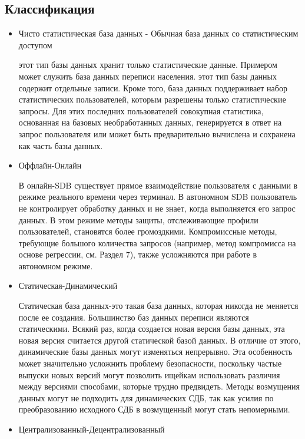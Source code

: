 \subsection{Классификация}
\begin{itemize}
Классифицирует по следующим признакам:
    \item Чисто статистическая база данных - Обычная база данных со статистическим доступом

этот тип базы данных хранит только статистические данные. Примером может служить база данных переписи населения.
этот тип базы данных содержит отдельные записи. Кроме того, база данных поддерживает набор статистических пользователей, которым разрешены только статистические запросы. Для этих последних пользователей совокупная статистика, основанная на базовых необработанных данных, генерируется в ответ на запрос пользователя или может быть предварительно вычислена и сохранена как часть базы данных.

    \item Оффлайн-Онлайн

В онлайн-SDB существует прямое взаимодействие пользователя с данными в режиме реального времени через терминал. В автономном SDB пользователь не контролирует обработку данных и не знает, когда выполняется его запрос данных. В этом режиме методы защиты, отслеживающие профили пользователей, становятся более громоздкими. Компромиссные методы, требующие большого количества запросов (например, метод компромисса на основе регрессии, см. Раздел 7), также усложняются при работе в автономном режиме.

    \item Статическая-Динамический

Статическая база данных-это такая база данных, которая никогда не меняется после ее создания. Большинство баз данных переписи являются статическими. Всякий раз, когда создается новая версия базы данных, эта новая версия считается другой статической базой данных. В отличие от этого, динамические базы данных могут изменяться непрерывно. Эта особенность может значительно усложнить проблему безопасности, поскольку частые выпуски новых версий могут позволить ищейкам использовать различия между версиями способами, которые трудно предвидеть. Методы возмущения данных могут не подходить для динамических СДБ, так как усилия по преобразованию исходного СДБ в возмущенный могут стать непомерными.

    \item Централизованный-Децентрализованный


\end{itemize}
